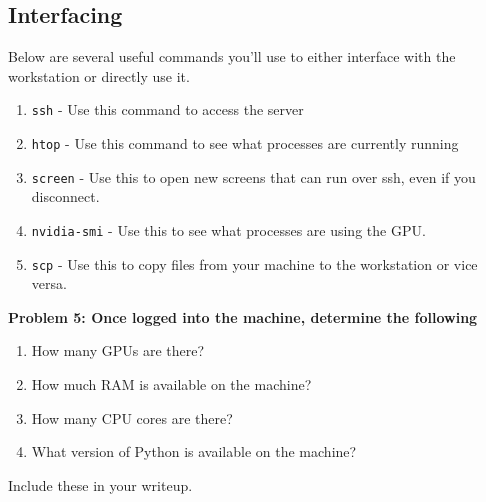 \subsection*{Interfacing}
Below are several useful commands you'll use to either interface with the workstation or directly use it.
\begin{enumerate}
    \item \texttt{ssh} - Use this command to access the server
	\item \texttt{htop} - Use this command to see what processes are currently running
	\item \texttt{screen} - Use this to open new screens that can run over ssh, even if you disconnect.
	\item \texttt{nvidia-smi} - Use this to see what processes are using the GPU.
    \item \texttt{scp} - Use this to copy files from your machine to the workstation or vice versa.
\end{enumerate}

{\bf Problem 5: Once logged into the machine, determine the following
\begin{enumerate}[label=(\alph*)]
    \item How many GPUs are there?
    \item How much RAM is available on the machine?
    \item How many CPU cores are there?
    \item What version of Python is available on the machine?
\end{enumerate}
Include these in your writeup.}